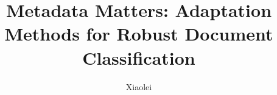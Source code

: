 \documentclass[defaultstyle,11pt]{thesis}
\title{Metadata Matters: Adaptation Methods for Robust Document Classification}
\author{Xiaolei}{Huang}
\begin{document}








\nocite{*}		%

% 
% 
\end{document}
